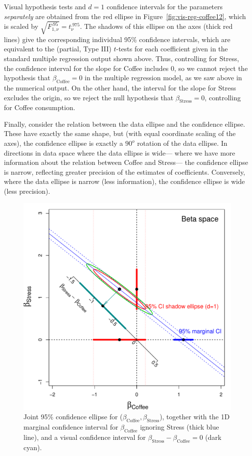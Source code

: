 \documentclass[11pt]{article}%
\newcommand*{\figref}[1]{Figure~\ref{#1}}
\begin{document}
Visual hypothesis tests and $d=1$ confidence intervals for the parameters \emph{separately} 
are obtained from the red ellipse in \figref{fig:vis-reg-coffee12},
which is scaled by $\sqrt{F^{.95}_{1, \nu}} = t^{.975}_\nu$.
The shadows of this ellipse on the axes (thick red lines) give the
corresponding individual 95\% confidence intervals, which are
equivalent to the (partial, Type III) $t$-tests for each coefficient given in the
standard multiple regression output shown above.
Thus, controlling for Stress, the confidence interval for the slope for Coffee includes 0,
so we cannot reject the hypothesis that $\beta_{\mathrm{Coffee}}=0$
in the multiple regression model, as we saw above in the numerical output.
On the other hand, the interval for the slope for Stress excludes the origin,
so we reject the null hypothesis that $\beta_{\mathrm{Stress}}=0$,
controlling for Coffee consumption.

Finally, consider the relation between the data ellipse and the 
confidence ellipse.  These have exactly the same shape, but
(with equal coordinate scaling of the axes), the confidence ellipse
is exactly a $90^o$ rotation of the data ellipse.  In directions in
data space where the data ellipse is wide--- where we have more information
about the relation between Coffee and Stress--- the confidence ellipse is
narrow, reflecting greater precision of the estimates of coefficients.
Conversely, where the data ellipse is narrow (less information), the
confidence ellipse is wide (less precision).

\begin{figure}[htb]
  \centering
  \includegraphics[width=.6\textwidth,clip]{fig/vis-reg-coffee13}
  \caption{Joint 95\% confidence ellipse for ($\beta_{\mathrm{Coffee}}, \beta_{\mathrm{Stress}}$), 
  together with the 1D marginal confidence interval for $\beta_{\mathrm{Coffee}}$
  ignoring Stress (thick blue line), and a visual confidence interval for $\beta_{\mathrm{Stress}} - \beta_{\mathrm{Coffee}}=0$
  (dark cyan).
  }%
  \label{fig:vis-reg-coffee13}
\end{figure}
\end{document}
